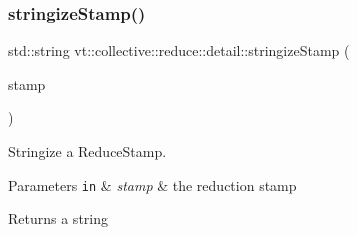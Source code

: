 \subsubsection{\texorpdfstring{stringize\+Stamp()}{stringizeStamp()}}
{\footnotesize\ttfamily std\+::string vt\+::collective\+::reduce\+::detail\+::stringize\+Stamp (\begin{DoxyParamCaption}\item[{\hyperlink{namespacevt_1_1collective_1_1reduce_1_1detail_abcd205dec83706f347d55c7528bf2664}{Reduce\+Stamp} const \&}]{stamp }\end{DoxyParamCaption})\hspace{0.3cm}{\ttfamily [inline]}}



Stringize a {\ttfamily Reduce\+Stamp}. 


\begin{DoxyParams}[1]{Parameters}
\mbox{\tt in}  & {\em stamp} & the reduction stamp\\
\hline
\end{DoxyParams}
\begin{DoxyReturn}{Returns}
a string 
\end{DoxyReturn}
